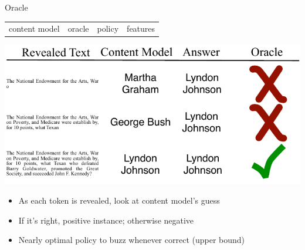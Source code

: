 \documentclass[compress]{beamer}
\begin{document}
\begin{frame}{Oracle}
\begin{block}{}
  \begin{center}
    \vspace{-.5cm}
    \begin{tabular}{cccc}
      content model & \alert{oracle} & policy & features \\
    \end{tabular}
    \vspace{-.5cm}
  \end{center}
\end{block}
\begin{center}
  \includegraphics[width=0.8\linewidth]{qb/oracle}
\end{center}

\begin{itemize}
  \item As each token is revealed, look at content model's guess
    \item If it's right, positive instance; otherwise negative
      \item Nearly optimal policy to buzz whenever correct (upper bound)
\end{itemize}

\end{frame}
\end{document}
